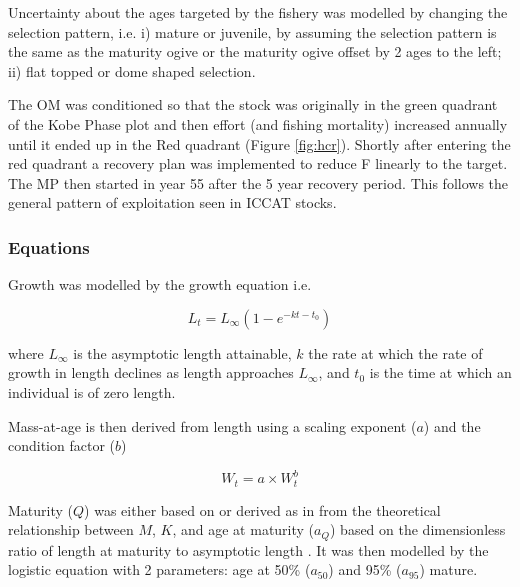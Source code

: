 \documentclass[%
nonumbib,      %
%
]{nrc1}                          %
\begin{document}
Uncertainty about the ages targeted by the fishery was modelled by changing the selection pattern, i.e. i) mature or juvenile, by  assuming the selection pattern is the same as the maturity ogive or the maturity ogive offset by 2 ages to the left; ii) flat topped or dome shaped selection. 


The OM was conditioned so that the stock was originally in the green quadrant of the Kobe Phase plot and then effort (and fishing mortality) increased annually until it ended up in the Red quadrant (Figure \ref{fig:hcr}). Shortly after entering the red quadrant a recovery plan was implemented to reduce F linearly to the target. The MP then started in year 55 after the 5 year recovery period. This follows the general pattern of exploitation seen in ICCAT stocks.


\subsubsection*{Equations}

Growth was modelled by the \cite{vonbert1957quantitative} growth equation i.e.
 
\begin{equation} L_t = L_{\infty}(1 - e^{-kt-t_0}) \end{equation} 
 
where $L_{\infty}$ is the asymptotic length attainable, $k$ the rate at which the rate of growth in length declines as length approaches
$L_{\infty}$, and $t_{0}$ is the time at which an individual is of zero length. 
 
Mass-at-age is then derived from length using a scaling exponent ($a$) and the condition factor ($b$)
 
\begin{equation} W_t = a \times W_t^b \end{equation} 
 
Maturity ($Q$) was either based on \cite{santiago2004dinamica}  or derived as in \cite{williams2003implications} 
from the theoretical relationship between $M$, $K$, and age at maturity ($a_{Q}$)  
based on the dimensionless ratio of length at maturity to asymptotic length \citep{beverton1992patterns}. It was then  
modelled by the logistic equation with 2 parameters: age at 50\% ($a_{50}$) and 95\% ($a_{95}$) mature.
\end{document}
